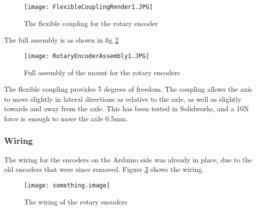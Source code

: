 \begin{figure}[H]
\centering
\texttt{[image: FlexibleCouplingRender1.JPG]}
\caption{The flexible coupling for the rotary encoder}
\label{fig::FCR}
\end{figure}

The full assembly is as shown in fig \ref{fig::REA}

\begin{figure}[H]
\centering
\texttt{[image: RotaryEncoderAssembly1.JPG]}
\caption{Full assembly of the mount for the rotary encoders}
\label{fig::REA}
\end{figure}

The flexible coupling provides 5 degrees of freedom.
The coupling allows the axis to move slightly in lateral directions as relative to the axle, as well as slightly towards and away from the axle.
This has been tested in Solidworks, and a 10N force is enough to move the axle 0.5mm.

\subsubsection{Wiring}
The wiring for the encoders on the Arduino side was already in place, due to the old encoders that were since removed.
Figure \ref{fig::WD} shows the wiring.

\begin{figure}[H]
\centering
\texttt{[image: something.image]}
\caption{The wiring of the rotary encoders}
\label{fig::WD}
\end{figure}



